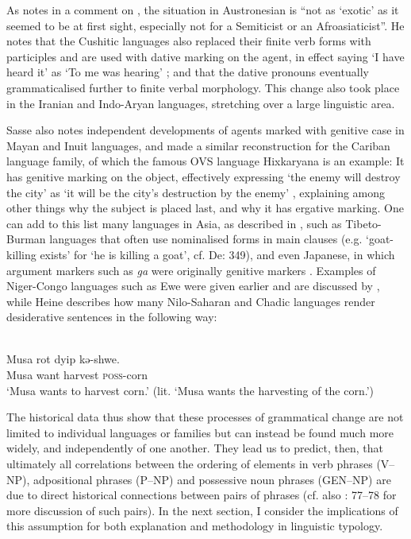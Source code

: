\documentclass[output=paper]{langsci/langscibook}
\begin{document}
As \citet[167]{Sasse2009} notes in a comment on \citet{Kaufman2009}, the situation in Austronesian is “not as ‘exotic’ as it seemed to be at first sight, especially not for a Semiticist or an Afroasiaticist”. He notes that the Cushitic languages also replaced their finite verb forms with participles and are used with dative marking on the agent, in effect saying ‘I have heard it’ as ‘To me was hearing’ \citep[174]{Sasse2009}; and that the dative pronouns eventually grammaticalised further to finite verbal morphology. This change also took place in the Iranian and Indo-Aryan languages, stretching over a large linguistic area. 

Sasse also notes independent developments of agents marked with genitive case in Mayan and Inuit languages, and \citet{Gildea1997} made a similar reconstruction for the Cariban language family, of which the famous OVS language Hixkaryana is an example: It has genitive marking on the object, effectively expressing ‘the enemy will destroy the city’ as ‘it will be the city’s destruction by the enemy’ \citep[153]{Gildea1997}, explaining among other things why the subject is placed last, and why it has ergative marking. One can add to this list many languages in Asia, as described in \citet{YapEtAl2011}, such as Tibeto-Burman languages that often use nominalised forms in main clauses (e.g. ‘goat-killing exists’ for ‘he is killing a goat’, cf. De\citealt{Lancey2011}: 349), and even Japanese, in which argument markers such as \textit{ga} were originally genitive markers \citep[461]{Shinzato2011}. Examples of Niger-Congo languages such as Ewe were given earlier and are discussed by \citet{Claudi1994}, while Heine describes how many Nilo-Saharan and Chadic languages render desiderative sentences in the following way:

\ea\label{ex:key:} 
\\
\gll Musa   rot   dyip   kə-shwe.\\
     Musa   want   harvest   \textsc{poss-}corn\\
\glt ‘Musa wants to harvest corn.’ (lit. ‘Musa wants the harvesting of the corn.’)
\z

The historical data thus show that these processes of grammatical change are not limited to individual languages or families but can instead be found much more widely, and independently of one another. They lead us to predict, then, that ultimately all correlations between the ordering of elements in verb phrases (V–NP), adpositional phrases (P–NP) and possessive noun phrases (GEN–NP) are due to direct historical connections between pairs of phrases (cf. also \citealt{Croft2003}: 77–78 for more discussion of such pairs). In the next section, I consider the implications of this assumption for both explanation and methodology in linguistic typology.
\end{document}
